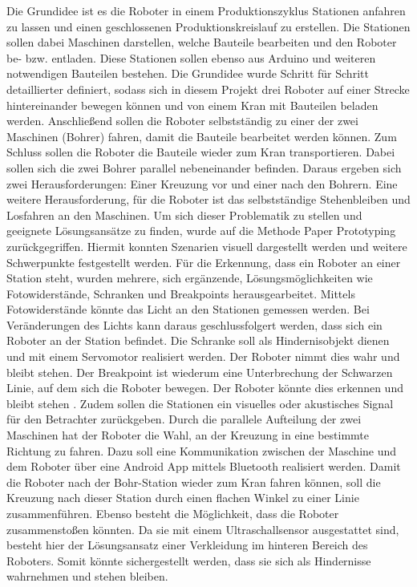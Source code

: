 Die Grundidee ist es die Roboter in einem Produktionszyklus Stationen anfahren zu lassen und einen geschlossenen Produktionskreislauf zu erstellen.  Die Stationen sollen dabei Maschinen darstellen, welche Bauteile bearbeiten und den Roboter be- bzw. entladen. Diese Stationen sollen ebenso aus Arduino und weiteren notwendigen Bauteilen  bestehen. Die Grundidee wurde Schritt für Schritt detaillierter definiert, sodass sich in diesem Projekt drei Roboter auf einer Strecke hintereinander bewegen können und von einem Kran mit Bauteilen beladen werden. Anschließend sollen die Roboter selbstständig zu einer der zwei Maschinen (Bohrer) fahren, damit die Bauteile bearbeitet werden können. Zum Schluss sollen die Roboter die Bauteile wieder zum
Kran transportieren. Dabei sollen sich die zwei Bohrer parallel nebeneinander befinden. 
Daraus ergeben sich zwei Herausforderungen: Einer Kreuzung vor und einer nach den Bohrern.
Eine weitere Herausforderung, für die Roboter ist das selbstständige Stehenbleiben und Losfahren an den Maschinen. Um sich dieser Problematik zu stellen und geeignete Lösungsansätze zu finden, wurde auf die Methode Paper Prototyping zurückgegriffen. Hiermit konnten Szenarien visuell dargestellt werden und weitere Schwerpunkte festgestellt werden. Für die Erkennung, dass ein
Roboter an einer Station steht, wurden mehrere, sich ergänzende, Lösungsmöglichkeiten wie Fotowiderstände, Schranken und Breakpoints herausgearbeitet. Mittels Fotowiderstände könnte das Licht an den Stationen gemessen werden. Bei Veränderungen des Lichts kann daraus geschlussfolgert werden, dass sich ein Roboter an der Station befindet. Die Schranke soll als Hindernisobjekt dienen und mit einem Servomotor realisiert werden. Der Roboter nimmt dies wahr und bleibt stehen.   
Der Breakpoint ist wiederum eine Unterbrechung der Schwarzen Linie, auf dem sich die Roboter bewegen. Der Roboter könnte dies erkennen und bleibt stehen .  Zudem sollen die Stationen ein visuelles oder akustisches Signal für den Betrachter zurückgeben.  Durch die parallele Aufteilung der zwei Maschinen hat der Roboter die Wahl, an der Kreuzung in eine bestimmte Richtung zu fahren. Dazu soll eine Kommunikation zwischen der Maschine und dem Roboter über eine Android App mittels Bluetooth realisiert werden. Damit die Roboter nach der Bohr-Station wieder zum Kran fahren können, soll die Kreuzung nach dieser Station durch einen flachen Winkel zu einer Linie zusammenführen. Ebenso besteht die Möglichkeit, dass die Roboter zusammenstoßen könnten. Da sie mit einem Ultraschallsensor ausgestattet sind, besteht hier der Lösungsansatz einer Verkleidung im hinteren Bereich des Roboters. Somit könnte sichergestellt werden, dass sie sich als Hindernisse
wahrnehmen und stehen bleiben.



